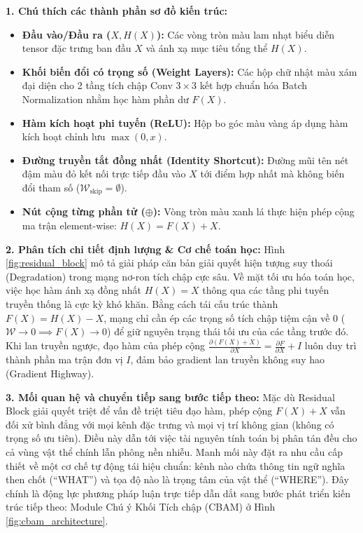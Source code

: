\documentclass[12pt,a4paper]{article}
\begin{document}
\begin{chartbox}[title={Chú thích \& Phân tích chuyên sâu Sơ đồ khối phần dư (Hình \ref{fig:residual_block})}]
\textbf{\color{blue!80!black}1. Chú thích các thành phần sơ đồ kiến trúc:}
\begin{itemize}[noitemsep,topsep=1pt,leftmargin=15pt]
    \item \textbf{Đầu vào/Đầu ra ($X, H(X)$):} Các vòng tròn màu lam nhạt biểu diễn tensor đặc trưng ban đầu $X$ và ánh xạ mục tiêu tổng thể $H(X)$.
    \item \textbf{Khối biến đổi có trọng số (Weight Layers):} Các hộp chữ nhật màu xám đại diện cho 2 tầng tích chập Conv $3\times 3$ kết hợp chuẩn hóa Batch Normalization nhằm học hàm phần dư $F(X)$.
    \item \textbf{Hàm kích hoạt phi tuyến (ReLU):} Hộp bo góc màu vàng áp dụng hàm kích hoạt chỉnh lưu $\max(0, x)$.
    \item \textbf{Đường truyền tắt đồng nhất (Identity Shortcut):} Đường mũi tên nét đậm màu đỏ kết nối trực tiếp đầu vào $X$ tới điểm hợp nhất mà không biến đổi tham số ($\mathcal{W}_{\text{skip}} = \emptyset$).
    \item \textbf{Nút cộng từng phần tử ($\oplus$):} Vòng tròn màu xanh lá thực hiện phép cộng ma trận element-wise: $H(X) = F(X) + X$.
\end{itemize}

\vspace{1mm}
\textbf{\color{blue!80!black}2. Phân tích chi tiết định lượng \& Cơ chế toán học:}
Hình \ref{fig:residual_block} mô tả giải pháp căn bản giải quyết hiện tượng suy thoái (Degradation) trong mạng nơ-ron tích chập cực sâu. Về mặt tối ưu hóa toán học, việc học hàm ánh xạ đồng nhất $H(X) = X$ thông qua các tầng phi tuyến truyền thống là cực kỳ khó khăn. Bằng cách tái cấu trúc thành $F(X) = H(X) - X$, mạng chỉ cần ép các trọng số tích chập tiệm cận về 0 ($\mathcal{W} \to 0 \implies F(X) \to 0$) để giữ nguyên trạng thái tối ưu của các tầng trước đó. Khi lan truyền ngược, đạo hàm của phép cộng $\frac{\partial (F(X)+X)}{\partial X} = \frac{\partial F}{\partial X} + I$ luôn duy trì thành phần ma trận đơn vị $I$, đảm bảo gradient lan truyền không suy hao (Gradient Highway).

\vspace{1mm}
\textbf{\color{blue!80!black}3. Mối quan hệ và chuyển tiếp sang bước tiếp theo:}
Mặc dù Residual Block giải quyết triệt để vấn đề triệt tiêu đạo hàm, phép cộng $F(X) + X$ vẫn đối xử bình đẳng với mọi kênh đặc trưng và mọi vị trí không gian (không có trọng số ưu tiên). Điều này dẫn tới việc tài nguyên tính toán bị phân tán đều cho cả vùng vật thể chính lẫn phông nền nhiễu. Manh mối này đặt ra nhu cầu cấp thiết về một cơ chế tự động tái hiệu chuẩn: kênh nào chứa thông tin ngữ nghĩa then chốt (``WHAT'') và tọa độ nào là trọng tâm của vật thể (``WHERE''). Đây chính là động lực phương pháp luận trực tiếp dẫn dắt sang bước phát triển kiến trúc tiếp theo: Module Chú ý Khối Tích chập (CBAM) ở Hình \ref{fig:cbam_architecture}.
\end{chartbox}
\end{document}

